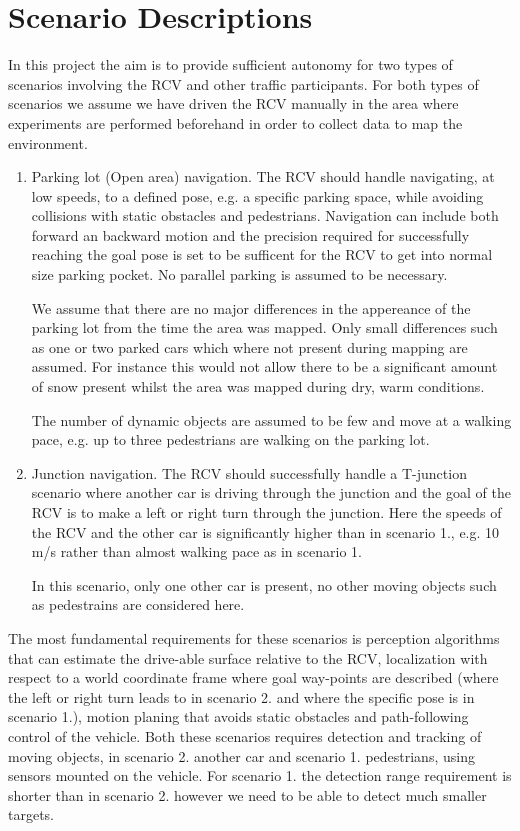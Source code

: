 \documentclass[11pt,a4paper]{article}
\begin{document}
\section{Scenario Descriptions}

In this project the aim is to provide sufficient autonomy for two
types of scenarios involving the RCV and other traffic participants.
For both types of scenarios we assume we have driven the RCV manually
in the area where experiments are performed beforehand in order to
collect data to map the environment.

\begin{enumerate}
\item  Parking lot (Open area) navigation. The RCV should handle navigating,
at low speeds, to a defined pose, e.g. a specific parking space, while
avoiding collisions with static obstacles and pedestrians. Navigation
can include both forward an backward motion and the precision
required for successfully reaching the goal pose is set to be
sufficent for the RCV to get into normal size parking pocket. No
parallel parking is assumed to be necessary.

We assume that there are no major differences in the appereance of the
parking lot from the time the area was mapped. Only small differences
such as one or two parked cars which where not present during mapping
are assumed. For instance this would not allow there to be a
significant amount of snow present whilst the area was mapped during
dry, warm conditions.

The number of dynamic objects are assumed to be few and move at a 
walking pace, e.g. up to three pedestrians are walking on the parking lot.


\item  Junction navigation. The RCV should successfully handle a T-junction
scenario where another car is driving through the junction and the
goal of the RCV is to make a left or right turn through the
junction. Here the speeds of the RCV and the other car is
significantly higher than in scenario 1., e.g. 10 m/s rather than
almost walking pace as in scenario 1.

In this scenario, only one other car is present, no other moving
objects such as pedestrains are considered here.

\end{enumerate}

The most fundamental requirements for these scenarios is perception
algorithms that can estimate the drive-able surface relative to the RCV,
localization with respect to a world coordinate frame where goal
way-points are described (where the left or right turn leads to in
scenario 2. and where the specific pose is in scenario 1.), motion
planing that avoids static obstacles and path-following control of the
vehicle. Both these scenarios requires detection and tracking of moving
objects, in scenario 2. another car and scenario 1. pedestrians, using
sensors mounted on the vehicle. For scenario 1. the detection range
requirement is shorter than in scenario 2.  however we need to be able
to detect much smaller targets.
\end{document}
